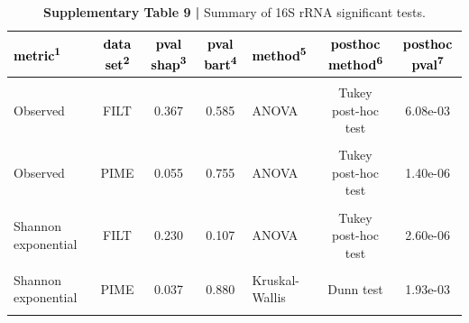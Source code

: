 \documentclass[
  10pt,
  letterpaper,
  DIV=11,
  numbers=noendperiod]{scrartcl}
\begin{document}
\begin{table}[H]

\caption{\textbf{Supplementary Table 9 |} Summary of 16S rRNA significant tests.}
\centering
\fontsize{8}{10}\selectfont
\begin{threeparttable}
\begin{tabular}[t]{lccclcc}
\toprule
\textcolor{black}{\textbf{metric\textsuperscript{1}}} & \textcolor{black}{\textbf{data set\textsuperscript{2}}} & \textcolor{black}{\textbf{pval shap\textsuperscript{3}}} & \textcolor{black}{\textbf{pval bart\textsuperscript{4}}} & \textcolor{black}{\textbf{method\textsuperscript{5}}} & \textcolor{black}{\textbf{posthoc method\textsuperscript{6}}} & \textcolor{black}{\textbf{posthoc pval\textsuperscript{7}}}\\
\midrule
\cellcolor{gray!6}{Observed} & \cellcolor{gray!6}{FULL} & \cellcolor{gray!6}{0.268} & \cellcolor{gray!6}{0.599} & \cellcolor{gray!6}{ANOVA} & \cellcolor{gray!6}{Tukey post-hoc test} & \cellcolor{gray!6}{6.05e-02}\\
Observed & FILT & 0.367 & 0.585 & ANOVA & Tukey post-hoc test & 6.08e-03\\
\cellcolor{gray!6}{Observed} & \cellcolor{gray!6}{PERFect} & \cellcolor{gray!6}{0.191} & \cellcolor{gray!6}{0.437} & \cellcolor{gray!6}{ANOVA} & \cellcolor{gray!6}{Tukey post-hoc test} & \cellcolor{gray!6}{5.05e-02}\\
Observed & PIME & 0.055 & 0.755 & ANOVA & Tukey post-hoc test & 1.40e-06\\
\addlinespace
\cellcolor{gray!6}{Shannon exponential} & \cellcolor{gray!6}{FULL} & \cellcolor{gray!6}{0.994} & \cellcolor{gray!6}{0.490} & \cellcolor{gray!6}{ANOVA} & \cellcolor{gray!6}{Tukey post-hoc test} & \cellcolor{gray!6}{6.27e-05}\\
Shannon exponential & FILT & 0.230 & 0.107 & ANOVA & Tukey post-hoc test & 2.60e-06\\
\cellcolor{gray!6}{Shannon exponential} & \cellcolor{gray!6}{PERFect} & \cellcolor{gray!6}{0.331} & \cellcolor{gray!6}{0.159} & \cellcolor{gray!6}{ANOVA} & \cellcolor{gray!6}{Tukey post-hoc test} & \cellcolor{gray!6}{7.10e-06}\\
Shannon exponential & PIME & 0.037 & 0.880 & Kruskal-Wallis & Dunn test & 1.93e-03\\
\addlinespace
\cellcolor{gray!6}{Inverse Simpson} & \cellcolor{gray!6}{FULL} & \cellcolor{gray!6}{0.584} & \cellcolor{gray!6}{0.155} & \cellcolor{gray!6}{ANOVA} & \cellcolor{gray!6}{Tukey post-hoc test} & \cellcolor{gray!6}{4.67e-05}\\

\end{tabular}
\end{threeparttable}
\end{table}
\end{document}
